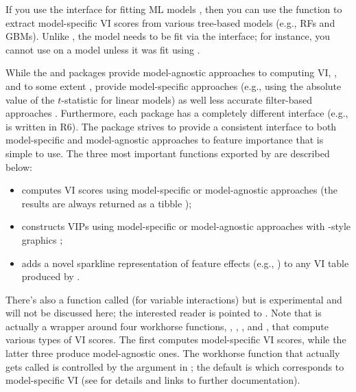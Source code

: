 If you use the  interface for fitting ML models
\citep{mlr-pkg}, then you can use the 
function to extract model-specific VI scores from various tree-based
models (e.g., RFs and GBMs). Unlike , the model needs to be
fit via the  interface; for instance, you cannot use
 on a  model \citep{gbm-pkg}
unless it was fit using .

While the  and  packages provide model-agnostic
approaches to computing VI, , and to some extent ,
provide model-specific approaches (e.g., using the absolute value of the
\(t\)-statistic for linear models) as well less accurate filter-based
approaches . Furthermore, each package has a completely different
interface (e.g.,  is written in R6). The  package
\citep{vip-pkg} strives to provide a consistent interface to both
model-specific and model-agnostic approaches to feature importance that
is simple to use. The three most important functions exported by
 are described below:

\begin{itemize}
 
  \item {} computes VI scores using model-specific or model-agnostic approaches (the results are always returned as a tibble \citep{tibble-pkg});
  
  \item {} constructs VIPs using model-specific or model-agnostic approaches with -style graphics \citep{ggplot2-pkg};
  
  \item {} adds a novel sparkline representation of feature effects (e.g., ) to any VI table produced by .

\end{itemize}

There's also a function called  (for variable interactions)
but is experimental and will not be discussed here; the interested
reader is pointed to \citet{greenwell-simple-2018}. Note that
 is actually a wrapper around four workhorse functions,
, , , and
, that compute various types of VI scores. The first
computes model-specific VI scores, while the latter three produce
model-agnostic ones. The workhorse function that actually gets called is
controlled by the  argument in ; the default is
 which corresponds to model-specific VI (see
 for details and links to further documentation).

